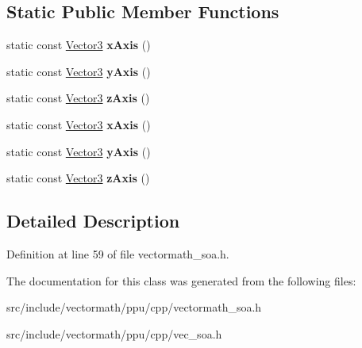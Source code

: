 \subsection*{Static Public Member Functions}
\begin{DoxyCompactItemize}
\item 
\hypertarget{classVectormath_1_1Soa_1_1Vector3_a73a285c366ee9d0ad110e62c87ad6d8d}{static const \hyperlink{classVectormath_1_1Soa_1_1Vector3}{Vector3} {\bfseries x\-Axis} ()}\label{classVectormath_1_1Soa_1_1Vector3_a73a285c366ee9d0ad110e62c87ad6d8d}

\item 
\hypertarget{classVectormath_1_1Soa_1_1Vector3_a16bb85c1f9c33861fa10ddc16ad85b85}{static const \hyperlink{classVectormath_1_1Soa_1_1Vector3}{Vector3} {\bfseries y\-Axis} ()}\label{classVectormath_1_1Soa_1_1Vector3_a16bb85c1f9c33861fa10ddc16ad85b85}

\item 
\hypertarget{classVectormath_1_1Soa_1_1Vector3_a161faad15f0e3a73b22c400f5edefc12}{static const \hyperlink{classVectormath_1_1Soa_1_1Vector3}{Vector3} {\bfseries z\-Axis} ()}\label{classVectormath_1_1Soa_1_1Vector3_a161faad15f0e3a73b22c400f5edefc12}

\item 
\hypertarget{classVectormath_1_1Soa_1_1Vector3_a152564d7413e60b5633d964512307628}{static const \hyperlink{classVectormath_1_1Soa_1_1Vector3}{Vector3} {\bfseries x\-Axis} ()}\label{classVectormath_1_1Soa_1_1Vector3_a152564d7413e60b5633d964512307628}

\item 
\hypertarget{classVectormath_1_1Soa_1_1Vector3_ad24024937de752e0468fc5487deaeae6}{static const \hyperlink{classVectormath_1_1Soa_1_1Vector3}{Vector3} {\bfseries y\-Axis} ()}\label{classVectormath_1_1Soa_1_1Vector3_ad24024937de752e0468fc5487deaeae6}

\item 
\hypertarget{classVectormath_1_1Soa_1_1Vector3_adbad8f188a7e8015e9f3a12bcd0c34fb}{static const \hyperlink{classVectormath_1_1Soa_1_1Vector3}{Vector3} {\bfseries z\-Axis} ()}\label{classVectormath_1_1Soa_1_1Vector3_adbad8f188a7e8015e9f3a12bcd0c34fb}

\end{DoxyCompactItemize}


\subsection{Detailed Description}


Definition at line 59 of file vectormath\-\_\-soa.\-h.



The documentation for this class was generated from the following files\-:\begin{DoxyCompactItemize}
\item 
src/include/vectormath/ppu/cpp/vectormath\-\_\-soa.\-h\item 
src/include/vectormath/ppu/cpp/vec\-\_\-soa.\-h\end{DoxyCompactItemize}
